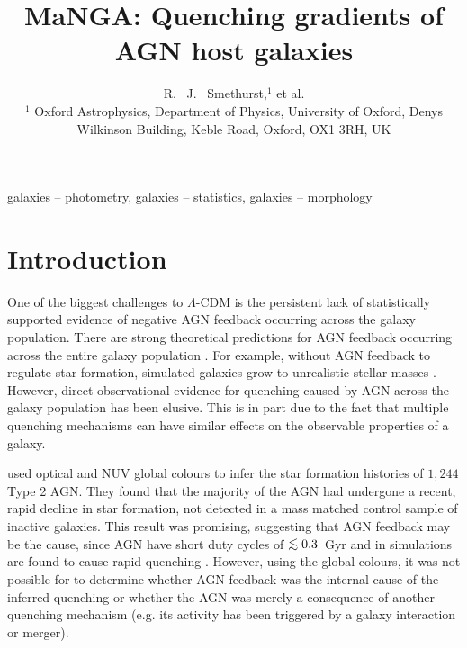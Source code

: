 \documentclass[useAMS,usenatbib]{mn2e}
\def\lesssim{\mathrel{\hbox{\rlap{\hbox{\lower3pt\hbox{$\sim$}}}\hbox{\raise2pt\hbox{$<$}}}}}
\begin{document}
\title[SFH gradients in MaNGA AGN]{MaNGA: Quenching gradients of AGN host galaxies}
\author[Smethurst et al. 2017]{R. ~J. ~Smethurst,$^{1}$ et al.
\\ $^1$ Oxford Astrophysics, Department of Physics, University of Oxford, Denys Wilkinson Building, Keble Road, Oxford, OX1 3RH, UK
}

\maketitle

\begin{abstract}
\end{abstract}

\begin{keywords}
galaxies -- photometry, galaxies -- statistics, galaxies -- morphology
\end{keywords}

\section{Introduction}\label{sec:intro}
One of the biggest challenges to $\Lambda$-CDM is the persistent lack of statistically supported evidence of negative AGN feedback occurring across the galaxy population. There are strong theoretical predictions for AGN feedback occurring across the entire galaxy population \citep{Fabian12, Gaibler12}. For example, without AGN feedback to regulate star formation, simulated galaxies grow to unrealistic stellar masses \citep[e.g.][]{silk12}. However, direct observational evidence for quenching caused by AGN across the galaxy population has been elusive. This is in part due to the fact that multiple quenching mechanisms can have similar effects on the observable properties of a galaxy. 

\citet{smethurst16} used optical and NUV global colours to infer the star formation histories of $1,244$ Type 2 AGN. They found that the majority of the AGN had undergone a recent, rapid decline in star formation, not detected in a mass matched control sample of inactive galaxies. This result was promising, suggesting that AGN feedback may be the cause, since AGN have short duty cycles of $\lesssim0.3$~Gyr \citep{martini04} and in simulations are found to cause rapid quenching \citep{tortora09}. However, using the global colours, it was not possible for \citeauthor{smethurst16} to determine whether AGN feedback was the internal cause of the inferred quenching or whether the AGN was merely a consequence of another quenching mechanism (e.g. its activity has been triggered by a galaxy interaction or merger).
\end{document}
